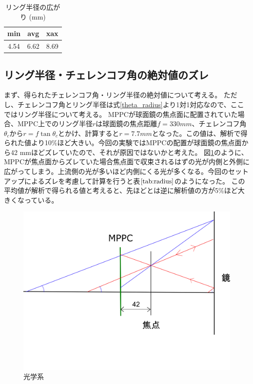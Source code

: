 \documentclass[uplatex, titlepage, dvipdfmx, 12pt, a4paper]{jsreport}
\begin{document}
    \begin{table}[b]
      \begin{center}
        \label{tab:radius}
        \caption{リング半径の広がり (mm)}
        \begin{tabular}{|c|c|c|}\hline
          min & avg & xax\\ \hline
          4.54 & 6.62 & 8.69\\ \hline
        \end{tabular}
      \end{center}
    \end{table}
    \subsection{リング半径・チェレンコフ角の絶対値のズレ}
      まず、得られたチェレンコフ角・リング半径の絶対値について考える。
      ただし、チェレンコフ角とリング半径は式\ref{theta_radius}より1対1対応なので、ここではリング半径について考える。
      MPPCが球面鏡の焦点面に配置されていた場合、MPPC上でのリング半径$r$は球面鏡の焦点距離$f=330 mm$、チェレンコフ角$\theta_{c}$から$r=f\tan{\theta_{c}}$とかけ、計算すると$r=7.7 mm$となった。この値は、解析で得られた値より10\%ほど大きい。今回の実験ではMPPCの配置が球面鏡の焦点面から42 mmほどズレていたので、それが原因ではないかと考えた。
      図\ref{fig:optical_system}のように、MPPCが焦点面からズレていた場合焦点面で収束されるはずの光が内側と外側に広がってしまう。上流側の光が多いほど内側にくる光が多くなる。今回のセットアップによるズレを考慮して計算を行うと表$\ref{tab:radius}$のようになった。
      この平均値が解析で得られる値と考えると、先ほどとは逆に解析値の方が5\%ほど大きくなっている。
      \begin{figure}[h]
        \begin{center} 
          \includegraphics[scale=1, clip]{image/optical_system.png}
          \caption{光学系} 
          \label{fig:optical_system} 
        \end{center}
      \end{figure}
\end{document}
